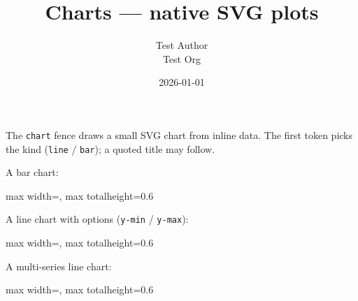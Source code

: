 \documentclass[11pt,a4paper]{article}
\title{Charts — native SVG plots}
\author{Test Author \\ Test Org}
\date{2026-01-01}
\theoremstyle{definition}
\begin{document}
\maketitle

The \texttt{chart} fence draws a small SVG chart from inline data. The first
token picks the kind (\texttt{line} / \texttt{bar}); a quoted title may follow.


A bar chart:


\begin{center}
\begin{adjustbox}{max width=\textwidth, max totalheight=0.6\textheight}

\end{adjustbox}
\end{center}


A line chart with options (\texttt{y-min} / \texttt{y-max}):


\begin{center}
\begin{adjustbox}{max width=\textwidth, max totalheight=0.6\textheight}

\end{adjustbox}
\end{center}


A multi-series line chart:


\begin{center}
\begin{adjustbox}{max width=\textwidth, max totalheight=0.6\textheight}

\end{adjustbox}
\end{center}
\end{document}
